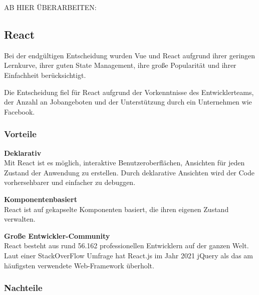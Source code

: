 {\cite{V02}}

AB HIER ÜBERARBEITEN:
\\

\subsection{React}
Bei der endgültigen Entscheidung wurden Vue und React aufgrund ihrer geringen Lernkurve, ihrer guten State Management, ihre große Popularität und ihrer Einfachheit berücksichtigt.

Die Entscheidung fiel für React aufgrund der Vorkenntnisse des Entwicklerteams, der Anzahl an Jobangeboten und der Unterstützung durch ein Unternehmen wie Facebook.


\subsubsection{Vorteile}
\textbf{Deklarativ} \\
Mit React ist es möglich, interaktive Benutzeroberflächen, Ansichten für jeden Zustand der Anwendung zu erstellen. %
Durch deklarative Ansichten wird der Code vorhersehbarer und einfacher zu debuggen.
\newline

\textbf{Komponentenbasiert}\\
React ist auf gekapselte Komponenten basiert, die ihren eigenen Zustand verwalten.
\newline

\textbf{Große Entwickler-Community}\\
React besteht aus rund 56.162 professionellen Entwicklern auf der ganzen Welt.
Laut einer StackOverFlow Umfrage hat React.js im Jahr 2021 jQuery als das am häufigsten verwendete Web-Framework überholt. {\cite{SO01}}
\newpage

\subsubsection{Nachteile}

